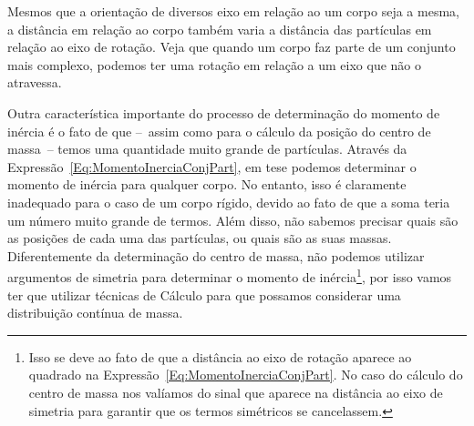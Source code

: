\begin{marginfigure}[-5cm]
\centering
{}
\caption{Mesmos que a orientação de diversos eixo em relação ao um corpo seja a mesma, a distância em relação ao corpo também varia a distância das partículas em relação ao eixo de rotação. Veja que quando um corpo faz parte de um conjunto mais complexo, podemos ter uma rotação em relação a um eixo que não o atravessa. \label{Fig:MomInerciaRotEixosParalelos}}
\end{marginfigure}

Outra característica importante do processo de determinação do momento de inércia é o fato de que --~assim como para o cálculo da posição do centro de massa~-- temos uma quantidade muito grande de partículas. Através da Expressão~\ref{Eq:MomentoInerciaConjPart}, em tese podemos determinar o momento de inércia para qualquer corpo. No entanto, isso é claramente inadequado para o caso de um corpo rígido, devido ao fato de que a soma teria um número muito grande de termos. Além disso, não sabemos precisar quais são as posições de cada uma das partículas, ou quais são as suas massas. Diferentemente da determinação do centro de massa, não podemos utilizar argumentos de simetria para determinar o momento de inércia\footnote{Isso se deve ao fato de que a distância ao eixo de rotação aparece ao quadrado na Expressão~\ref{Eq:MomentoInerciaConjPart}. No caso do cálculo do centro de massa nos valíamos do sinal que aparece na distância ao eixo de simetria para garantir que os termos simétricos se cancelassem.}, por isso vamos ter que utilizar técnicas de Cálculo para que possamos considerar uma distribuição contínua de massa.

